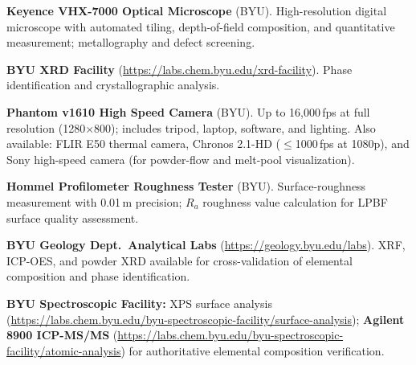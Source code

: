 \documentclass[11pt,letterpaper]{article}
\begin{document}
\smallskip
\noindent
\textbf{Keyence VHX-7000 Optical Microscope} (BYU).
High-resolution digital microscope with automated tiling,
depth-of-field composition, and quantitative measurement;
metallography and defect screening.

\smallskip
\noindent
\textbf{BYU XRD Facility}
(\url{https://labs.chem.byu.edu/xrd-facility}).  Phase identification
and crystallographic analysis.

\smallskip
\noindent
\textbf{Phantom v1610 High Speed Camera} (BYU).
Up to 16{,}000\,fps at full resolution (1280$\times$800);
includes tripod, laptop, software, and lighting.
Also available: FLIR E50 thermal camera,
Chronos 2.1-HD ($\leq$1000\,fps at 1080p),
and Sony high-speed camera (for powder-flow and melt-pool visualization).

\smallskip
\noindent
\textbf{Hommel Profilometer Roughness Tester} (BYU).
Surface-roughness measurement with 0.01\,\textmu{}m precision;
$R_a$ roughness value calculation for LPBF surface quality assessment.

\smallskip
\noindent
\textbf{BYU Geology Dept.\ Analytical Labs}
(\url{https://geology.byu.edu/labs}).  XRF, ICP-OES, and powder XRD
available for cross-validation of elemental composition and
phase identification.

\smallskip
\noindent
\textbf{BYU Spectroscopic Facility:} XPS surface analysis
(\url{https://labs.chem.byu.edu/byu-spectroscopic-facility/surface-analysis});
\textbf{Agilent 8900 ICP-MS/MS}
(\url{https://labs.chem.byu.edu/byu-spectroscopic-facility/atomic-analysis})
for authoritative elemental composition verification.
\end{document}
